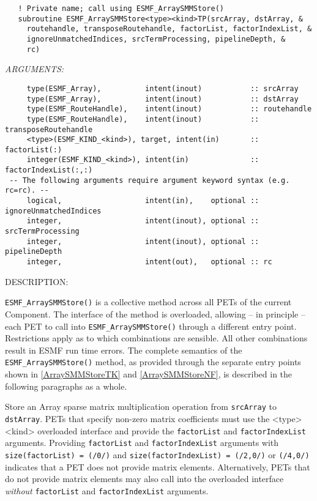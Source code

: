   
\begin{verbatim}   ! Private name; call using ESMF_ArraySMMStore()
   subroutine ESMF_ArraySMMStore<type><kind>TP(srcArray, dstArray, &
     routehandle, transposeRoutehandle, factorList, factorIndexList, &
     ignoreUnmatchedIndices, srcTermProcessing, pipelineDepth, &
     rc)\end{verbatim}{\em ARGUMENTS:}
\begin{verbatim}     type(ESMF_Array),          intent(inout)           :: srcArray
     type(ESMF_Array),          intent(inout)           :: dstArray
     type(ESMF_RouteHandle),    intent(inout)           :: routehandle
     type(ESMF_RouteHandle),    intent(inout)           :: transposeRoutehandle
     <type>(ESMF_KIND_<kind>), target, intent(in)       :: factorList(:)
     integer(ESMF_KIND_<kind>), intent(in)              :: factorIndexList(:,:)
 -- The following arguments require argument keyword syntax (e.g. rc=rc). --
     logical,                   intent(in),    optional :: ignoreUnmatchedIndices
     integer,                   intent(inout), optional :: srcTermProcessing
     integer,                   intent(inout), optional :: pipelineDepth
     integer,                   intent(out),   optional :: rc\end{verbatim}
{\sf DESCRIPTION:\\ }


   \label{ArraySMMStoreTK}
   {\tt ESMF\_ArraySMMStore()} is a collective method across all PETs of the
   current Component. The interface of the method is overloaded, allowing 
   -- in principle -- each PET to call into {\tt ESMF\_ArraySMMStore()}
   through a different entry point. Restrictions apply as to which combinations
   are sensible. All other combinations result in ESMF run time errors. The
   complete semantics of the {\tt ESMF\_ArraySMMStore()} method, as provided
   through the separate entry points shown in \ref{ArraySMMStoreTK} and
   \ref{ArraySMMStoreNF}, is described in the following paragraphs as a whole.
  
     \begin{sloppypar}
     Store an Array sparse matrix multiplication operation from {\tt srcArray}
     to {\tt dstArray}. PETs that specify non-zero matrix coefficients must use
     the <type><kind> overloaded interface and provide the {\tt factorList} and
     {\tt factorIndexList} arguments. Providing {\tt factorList} and
     {\tt factorIndexList} arguments with {\tt size(factorList) = (/0/)} and
     {\tt size(factorIndexList) = (/2,0/)} or {\tt (/4,0/)} indicates that a 
     PET does not provide matrix elements. Alternatively, PETs that do not 
     provide matrix elements may also call into the overloaded interface
     {\em without} {\tt factorList} and {\tt factorIndexList} arguments.
     \end{sloppypar}
  

